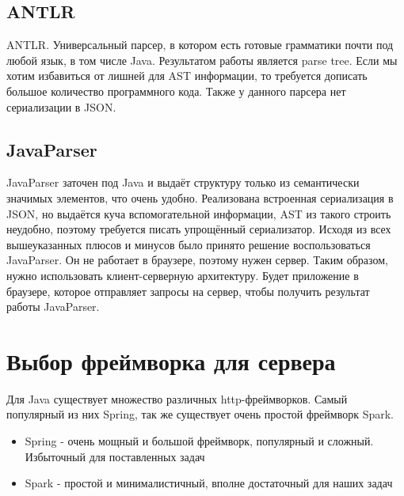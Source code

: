 \subsection{ANTLR} \label{ch2:subsec-title-abbr}
ANTLR. Универсальный парсер, в котором есть готовые грамматики почти под любой язык, в том числе Java. Результатом работы является parse tree. Если мы хотим избавиться от лишней для AST информации, то требуется дописать большое количество программного кода. Также у данного парсера нет сериализации в JSON.
\subsection{JavaParser} \label{ch2:subsec-title-abbr}
JavaParser заточен под Java и выдаёт структуру только из семантически значимых элементов, что очень удобно. Реализована встроенная сериализация в JSON, но выдаётся куча вспомогательной информации, AST из такого строить неудобно, поэтому требуется писать упрощённый сериализатор.
Исходя из всех вышеуказанных плюсов и минусов было принято решение воспользоваться JavaParser. Он не работает в браузере, поэтому нужен сервер. Таким образом, нужно использовать клиент-серверную архитектуру. Будет приложение в браузере, которое отправляет запросы на сервер, чтобы получить результат работы JavaParser.
\section{Выбор фреймворка для сервера} \label{ch4:sec2}
Для Java существует множество различных http-фреймворков. Самый популярный из них Spring, так же существует очень простой фреймворк Spark.
\begin{itemize}
\item Spring - очень мощный и большой фреймворк, популярный и сложный. Избыточный для поставленных задач
\item Spark - простой и минималистичный, вполне достаточный для наших задач
\end{itemize}
